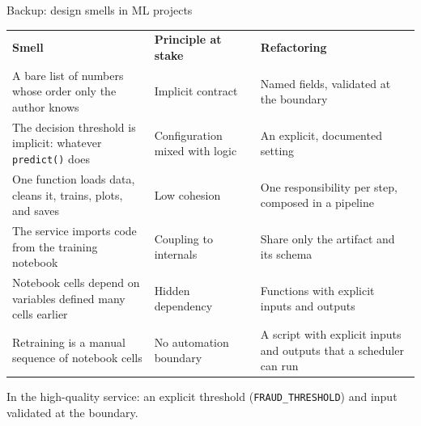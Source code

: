 \begin{cframe}{Backup: design smells in ML projects}{}
\centering
\renewcommand{\arraystretch}{1.2}
\setlength{\tabcolsep}{5pt}
{\footnotesize
\begin{tabularx}{\textwidth}{>{\raggedright\arraybackslash}p{4.9cm} >{\raggedright\arraybackslash}p{3.3cm} >{\raggedright\arraybackslash}X}
\rowcolor{courseblue}
\color{white}\textbf{Smell} & \color{white}\textbf{Principle at stake} & \color{white}\textbf{Refactoring} \\
A bare list of numbers whose order only the author knows & Implicit contract & Named fields, validated at the boundary \\
\rowcolor{courseice}
The decision threshold is implicit: whatever \texttt{predict()} does & Configuration mixed with logic & An explicit, documented setting \\
One function loads data, cleans it, trains, plots, and saves & Low cohesion & One responsibility per step, composed in a pipeline \\
\rowcolor{courseice}
The service imports code from the training notebook & Coupling to internals & Share only the artifact and its schema \\
Notebook cells depend on variables defined many cells earlier & Hidden dependency & Functions with explicit inputs and outputs \\
\rowcolor{courseice}
Retraining is a manual sequence of notebook cells & No automation boundary & A script with explicit inputs and outputs that a scheduler can run \\
\end{tabularx}}

\vspace{0.5em}
{\scriptsize In the high-quality service: an explicit threshold (\texttt{FRAUD\_THRESHOLD}) and input validated at the boundary.}
\coursefooter
\end{cframe}


